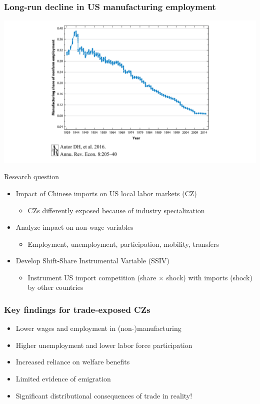 \documentclass[notes=show]{beamer}
\begin{document}
\begin{frame}
\frametitle{Long-run decline in US manufacturing employment}
\begin{center}
\includegraphics[width=\textwidth]{AR-fig-1.pdf}%
\end{center}
\end{frame}

\begin{frame}{Research question}
\begin{itemize}
\item<1-> Impact of Chinese imports on US local labor markets (CZ)
\begin{itemize} \medskip
\item<1-> CZs differently exposed because of industry specialization 
\end{itemize} \bigskip
\item<1-> Analyze impact on non-wage variables 
\begin{itemize} \medskip
\item<1-> Employment, unemployment, participation, mobility, transfers 
\end{itemize} \bigskip
\item<1-> Develop Shift-Share Instrumental Variable (SSIV)
\begin{itemize} \medskip
\item<1-> Instrument US import competition (share $\times$ shock) with imports (shock) by other countries
\end{itemize}
\end{itemize}
\end{frame}

\begin{frame}
\frametitle{Key findings for trade-exposed CZs}
\begin{itemize}
\item<1-> Lower wages and employment in (non-)manufacturing \bigskip
\item<1-> Higher unemployment and lower labor force participation \bigskip
\item<1-> Increased reliance on welfare benefits \bigskip
\item<1-> Limited evidence of emigration \bigskip
\item<1-> Significant distributional consequences of trade in reality!
\end{itemize}
\end{frame}
\end{document}
